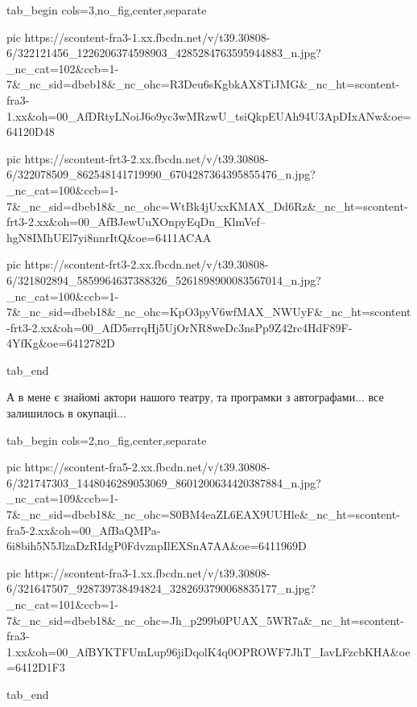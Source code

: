  
 
 
 
 

\begin{center}
\begin{minipage}{\textwidth}

\ifcmt
  tab_begin cols=3,no_fig,center,separate

     pic https://scontent-fra3-1.xx.fbcdn.net/v/t39.30808-6/322121456_1226206374598903_4285284763595944883_n.jpg?_nc_cat=102&ccb=1-7&_nc_sid=dbeb18&_nc_ohc=R3Deu6sKgbkAX8TiJMG&_nc_ht=scontent-fra3-1.xx&oh=00_AfDRtyLNoiJ6o9yc3wMRzwU_tsiQkpEUAh94U3ApDIxANw&oe=64120D48

     pic https://scontent-frt3-2.xx.fbcdn.net/v/t39.30808-6/322078509_862548141719990_6704287364395855476_n.jpg?_nc_cat=100&ccb=1-7&_nc_sid=dbeb18&_nc_ohc=WtBk4jUxxKMAX_Dd6Rz&_nc_ht=scontent-frt3-2.xx&oh=00_AfBJewUuXOnpyEqDn_KlmVef--hgN8IMhUEl7yi8nnrItQ&oe=6411ACAA

     pic https://scontent-frt3-2.xx.fbcdn.net/v/t39.30808-6/321802894_5859964637388326_5261898900083567014_n.jpg?_nc_cat=100&ccb=1-7&_nc_sid=dbeb18&_nc_ohc=KpO3pyV6wfMAX_NWUyF&_nc_ht=scontent-frt3-2.xx&oh=00_AfD5srrqHj5UjOrNR8weDc3nsPp9Z42rc4HdF89F-4YfKg&oe=6412782D

  tab_end
\fi

\end{minipage}
\end{center}


А в мене є знайомі актори нашого театру, та програмки з автографами... все
залишилось в окупаціі...

\begin{center}
\begin{minipage}{\textwidth}

\ifcmt
  tab_begin cols=2,no_fig,center,separate

     pic https://scontent-fra5-2.xx.fbcdn.net/v/t39.30808-6/321747303_1448046289053069_8601200634420387884_n.jpg?_nc_cat=109&ccb=1-7&_nc_sid=dbeb18&_nc_ohc=S0BM4eaZL6EAX9UUHle&_nc_ht=scontent-fra5-2.xx&oh=00_AfBaQMPa-6i8bih5N5JlzaDzRIdgP0FdvznpIlEXSnA7AA&oe=6411969D

     pic https://scontent-fra3-1.xx.fbcdn.net/v/t39.30808-6/321647507_928739738494824_3282693790068835177_n.jpg?_nc_cat=101&ccb=1-7&_nc_sid=dbeb18&_nc_ohc=Jh_p299b0PUAX_5WR7a&_nc_ht=scontent-fra3-1.xx&oh=00_AfBYKTFUmLup96jiDqolK4q0OPROWF7JhT_IavLFzcbKHA&oe=6412D1F3

  tab_end
\fi

\end{minipage}
\end{center}

